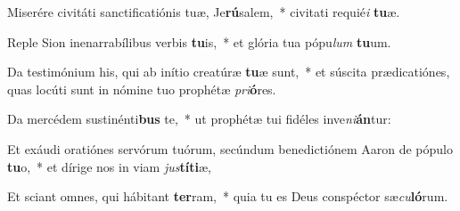 \item Miserére civitáti sanctificatiónis tuæ, Je\textbf{rú}salem,~* civitati requié\textit{i} \textbf{tu}æ.
\item Reple Sion inenarrabílibus verbis \textbf{tu}is,~* et glória tua pópu\textit{lum} \textbf{tu}um.
\item Da testimónium his, qui ab inítio creatúræ \textbf{tu}æ sunt,~* et súscita prædicatiónes, quas locúti sunt in nómine tuo prophétæ \textit{pri}\textbf{ó}res.
\item Da mercédem sustinénti\textbf{bus} te,~* ut prophétæ tui fidéles inve\textit{ni}\textbf{án}tur:
\item Et exáudi oratiónes servórum tuórum, secúndum benedictiónem Aaron de pópulo \textbf{tu}o,~* et dírige nos in viam \textit{jus}\textbf{tí}\textbf{ti}æ,
\item Et sciant omnes, qui hábitant \textbf{ter}ram,~* quia tu es Deus conspéctor sæ\textit{cu}\textbf{ló}rum.
